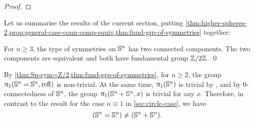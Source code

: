 \documentclass[english,a4paper]{lmcs}
\begin{document}
\begin{proof}
\end{proof}


Let us summarise the results of the current section, putting \cref{thm:higher-spheres-2,prop:general-case-conn-comp-equiv,thm:fund-grp-of-symmetries} together:

\begin{thm}
    For $n \geq 3$, the type of symmetries on ${\mathbb S^{n}}$ has two connected components. The two components are equivalent and both have fundamental group $\mathbb{Z} \slash 2\mathbb{Z}$. \qed
\end{thm}


\begin{rem}\label{rem:not-generalising}
	By \cref{thm:Sp-sym=Z/2,thm:fund-grp-of-symmetries}, for $n \geq 2$, the group $\uppi_{1}({\mathbb S^{n}} = {\mathbb S^{n}}, \mathop{{\mathrm{refl}}_{}})$ is non-trivial. At the same time, $\uppi_{1}({\mathbb S^{n}})$ is trivial by \cite{HoTT}, and by $0$-connectedness of ${\mathbb S^{n}}$, the group
	$\uppi_{1}({\mathbb S^{n}} + {\mathbb S^{n}}, x)$ is trivial for any $x$.
	Therefore, in contrast to the result for the case $n \equiv 1$ in \cref{sec:circle-case}, we have
	\begin{equation}
	({\mathbb S^{n}} = {\mathbb S^{n}}) \not= ({\mathbb S^{n}} + {\mathbb S^{n}}).
	\end{equation}
\end{rem}
\end{document}
